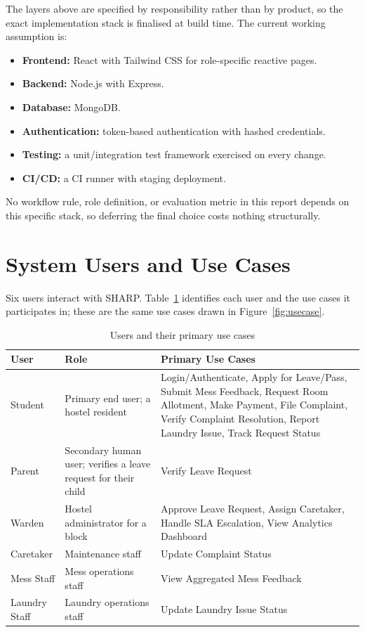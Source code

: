 \documentclass{tietreport}
\begin{document}
The layers above are specified by responsibility rather than by product,
so the exact implementation stack is finalised at build time. The current
working assumption is:

\begin{itemize}
  \item \textbf{Frontend:} React with Tailwind CSS for role-specific
    reactive pages.
  \item \textbf{Backend:} Node.js with Express.
  \item \textbf{Database:} MongoDB.
  \item \textbf{Authentication:} token-based authentication with hashed
    credentials.
  \item \textbf{Testing:} a unit/integration test framework exercised on
    every change.
  \item \textbf{CI/CD:} a CI runner with staging deployment.
\end{itemize}

No workflow rule, role definition, or evaluation metric in this report
depends on this specific stack, so deferring the final choice costs
nothing structurally.

\section{System Users and Use Cases}
\label{sec:actors}

Six users interact with SHARP. Table~\ref{tab:actors} identifies each
user and the use cases it participates in; these are the same use cases
drawn in Figure~\ref{fig:usecase}.

\begin{table}[h]
\centering
\small
\begin{tabular}{|l|p{3.6cm}|p{6.6cm}|}
  \hline
  \textbf{User} & \textbf{Role} & \textbf{Primary Use Cases} \\
  \hline
  Student & Primary end user; a hostel resident & Login/Authenticate, Apply
    for Leave/Pass, Submit Mess Feedback, Request Room Allotment, Make
    Payment, File Complaint, Verify Complaint Resolution, Report Laundry
    Issue, Track Request Status \\
  \hline
  Parent & Secondary human user; verifies a leave request for their
    child & Verify Leave Request \\
  \hline
  Warden & Hostel administrator for a block & Approve Leave Request,
    Assign Caretaker, Handle SLA Escalation, View Analytics Dashboard \\
  \hline
  Caretaker & Maintenance staff & Update Complaint Status \\
  \hline
  Mess Staff & Mess operations staff & View Aggregated Mess Feedback \\
  \hline
  Laundry Staff & Laundry operations staff & Update Laundry Issue Status \\
  \hline
\end{tabular}
\caption{Users and their primary use cases}
\label{tab:actors}
\end{table}
\end{document}
